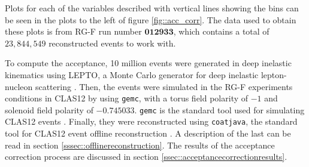     Plots for each of the variables described with vertical lines showing the bins can be seen in the plots to the left of figure \ref{fig::acc_corr}.
    The data used to obtain these plots is from RG-F run number $\mathbf{012933}$, which contains a total of $23,844,549$ reconstructed events to work with.

    To compute the acceptance, 10 million events were generated in deep inelastic kinematics using LEPTO, a Monte Carlo generator for deep inelastic lepton-nucleon scattering \cite{ingelman1997}.
    Then, the events were simulated in the RG-F experiments conditions in CLAS12 by using \texttt{gemc}, with a torus field polarity of $-1$ and solenoid field polarity of $-0.745033$.
    \texttt{gemc} is the standard tool used for simulating CLAS12 events \cite{ungaro2020gemc}.
    Finally, they were reconstructed using \texttt{coatjava}, the standard tool for CLAS12 event offline reconstruction \cite{ziegler2020}.
    A description of the last can be read in section \ref{sssec::offlinereconstruction}.
    The results of the acceptance correction process are discussed in section \ref{ssec::acceptancecorrectionresults}.
